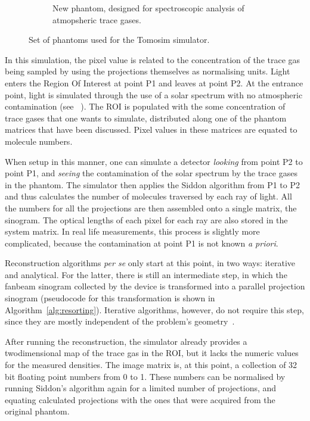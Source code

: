 \begin{figure}
\begin{subfigure}[t]{0.45\textwidth}
\begin{center}
    \end{center}
    \caption{New phantom, designed for spectroscopic analysis of
    atmopsheric trace gases.}
    \label{fig:new_phantom}
    \end{subfigure}
    \caption{Set of phantoms used for the Tomosim simulator.}
\end{figure}

In this simulation, the pixel value is related to the concentration of
the trace gas being sampled by using the projections themselves as
normalising units. Light enters the Region Of Interest at point P1 and
leaves at point P2. At the entrance point, light is simulated through
the use of a solar spectrum with no atmospheric contamination (see
~\cite{Kurucz1984}). The ROI is populated with the some concentration of
trace gases that one wants to simulate, distributed along one of the
phantom matrices that have been discussed. Pixel values in these
matrices are equated to molecule numbers.

When setup in this manner, one can simulate a detector \emph{looking}
from point P2 to point P1, and \emph{seeing} the contamination of the
solar spectrum by the trace gases in the phantom. The simulator then
applies the Siddon algorithm from P1 to P2 and thus calculates the
number of molecules traversed by each ray of light. All the numbers for
all the projections are then assembled onto a single matrix, the
sinogram. The optical lengths of each pixel for each ray are also stored
in the system matrix. In real life measurements, this process is
slightly more complicated, because the contamination at point P1 is not
known \emph{a priori}.

Reconstruction algorithms \emph{per se} only start at this point, in two
ways: iterative and analytical. For the latter, there is still an
intermediate step, in which the fanbeam sinogram collected by the device
is transformed into a parallel projection sinogram (pseudocode for this
transformation is shown in Algorithm~\ref{alg:resorting}). Iterative
algorithms, however, do not require this step, since they are mostly
independent of the problem's geometry~\cite{Defrise2003}.

After running the reconstruction, the simulator already provides a
twodimensional map of the trace gas in the ROI, but it lacks the numeric
values for the measured densities. The image matrix is, at this point, a
collection of 32 bit floating point numbers from 0 to 1. These numbers
can be normalised by running Siddon's algorithm again for a limited
number of projections, and equating calculated projections with the ones
that were acquired from the original phantom.

